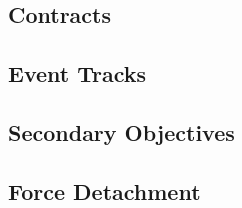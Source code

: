 

\subsection{Contracts}



\subsection{Event Tracks}



\subsection{Secondary Objectives}



\subsection{Force Detachment}


